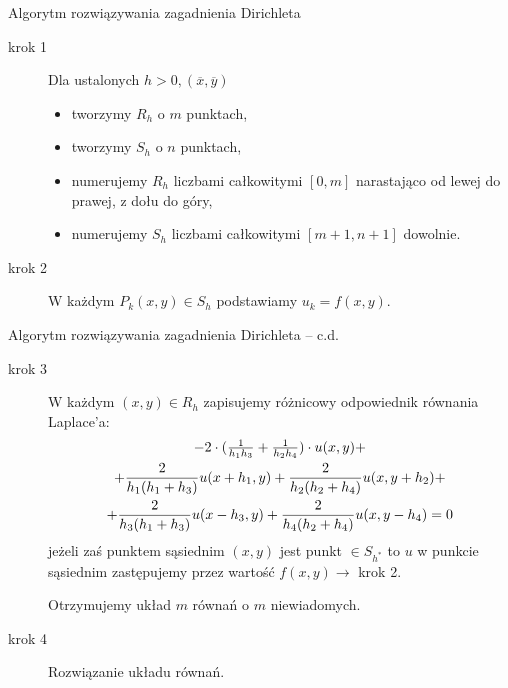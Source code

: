 \begin{frame}
  \begin{block}{Algorytm rozwiązywania zagadnienia Dirichleta}
    \begin{description}
      \item[krok 1]
        Dla ustalonych $h>0, (\overline{x},\overline{y})$
        \begin{itemize}
          \item tworzymy $R_h$ o $m$ punktach,
          \item tworzymy $S_h$ o $n$ punktach,
          \item numerujemy $R_h$ liczbami całkowitymi $[0,m]$ narastająco od lewej do prawej, z dołu do góry,
          \item numerujemy $S_h$ liczbami całkowitymi $[m+1, n+1]$ dowolnie.
        \end{itemize}
      \item[krok 2]
        W każdym $P_k(x,y) \in S_h$ podstawiamy $u_k = f(x,y)$.
    \end{description}
  \end{block}
\end{frame}

\begin{frame}
  \begin{block}{Algorytm rozwiązywania zagadnienia Dirichleta -- c.d.}
    \begin{description}
      \item[krok 3]
        W każdym $(x,y) \in R_h$ zapisujemy różnicowy odpowiednik równania Laplace'a:
        \begin{multline*}
          $$-2 \cdot ( \frac{1}{h_1 h_3} + \frac{1}{h_2 h_4}) \cdot u(x,y) + \\
          + \frac{2}{h_1 (h_1 + h_3)} u(x+h_1,y) + \frac{2}{h_2 (h_2 + h_4)} u(x,y + h_2) + \\
          + \frac{2}{h_3 (h_1 + h_3)} u(x-h_3,y)+\frac{2}{h_4 (h_2 + h_4)} u(x,y - h_4)=0$$
        \end{multline*}
        jeżeli zaś punktem sąsiednim $(x,y)$ jest punkt $\in S_{h^*}$
        to $u$ w punkcie sąsiednim zastępujemy przez wartość $f(x,y) \rightarrow$ krok 2.

        Otrzymujemy układ $m$ równań o $m$ niewiadomych.
      \item[krok 4]
        Rozwiązanie układu równań.
    \end{description}
  \end{block}
\end{frame}

